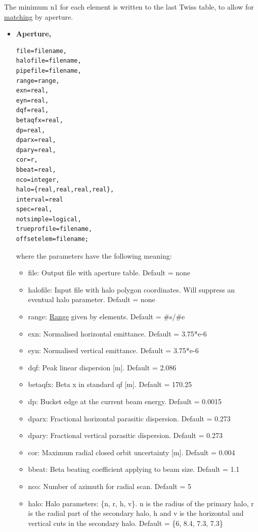  The minimum n1 for each element is written to the last Twiss table, to allow for \href{../match/match.html}{matching} by aperture.  
\begin{itemize}
	\item 

\textbf{Aperture,}
\begin{verbatim}
file=filename,
halofile=filename,
pipefile=filename,
range=range,
exn=real,
eyn=real,
dqf=real,
betaqfx=real,
dp=real,
dparx=real,
dpary=real,
cor=r,
bbeat=real,
nco=integer,
halo={real,real,real,real},
interval=real
spec=real,
notsimple=logical,
trueprofile=filename,
offsetelem=filename;
\end{verbatim} where the parameters have the following meaning: 
\begin{itemize}
	\item file: Output file with aperture table. Default = none 
	\item halofile: Input file with halo polygon coordinates. Will suppress  an eventual halo parameter. Default = none 
	\item range: \href{../Introduction/ranges.html}{Range} given by  elements. Default = \#s/\#e 
	\item exn: Normalised horizontal emittance. Default = 3.75*e-6 
	\item eyn: Normalised vertical emittance. Default = 3.75*e-6 
	\item dqf: Peak linear dispersion [m]. Default = 2.086 
	\item betaqfx: Beta x in standard qf [m]. Default = 170.25 
	\item dp: Bucket edge at the current beam energy. Default = 0.0015 
	\item dparx: Fractional horizontal parasitic dispersion. Default = 0.273 
	\item dpary: Fractional vertical parasitic dispersion. Default = 0.273 
	\item cor: Maximum radial closed orbit uncertainty [m]. Default = 0.004 
	\item bbeat: Beta beating coefficient applying to beam size. Default = 1.1 
	\item nco: Number of azimuth for radial scan. Default = 5 
	\item halo: Halo parameters: \{n, r, h, v\}. n is the radius of the primary halo,  r is the radial part of the secondary halo, h and v is the horizontal and  vertical cuts in the secondary halo. Default = \{6, 8.4, 7.3, 7.3\} 

\end{itemize}
\end{itemize}
